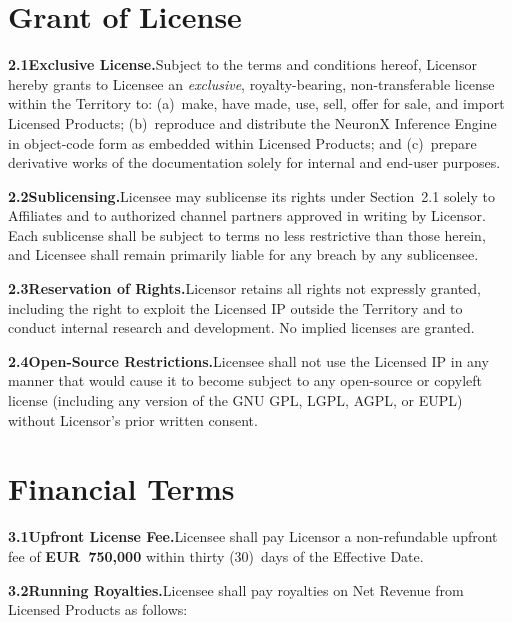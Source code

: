 \documentclass[11pt,a4paper]{article}
\begin{document}
\section{Grant of License}

\textbf{2.1\enspace Exclusive License.}\enspace Subject to the terms and conditions hereof,
Licensor hereby grants to Licensee an \textit{exclusive}, royalty-bearing, non-transferable
license within the Territory to: (a)~make, have made, use, sell, offer for sale, and import
Licensed Products; (b)~reproduce and distribute the NeuronX Inference Engine in object-code form
as embedded within Licensed Products; and (c)~prepare derivative works of the documentation
solely for internal and end-user purposes.

\textbf{2.2\enspace Sublicensing.}\enspace Licensee may sublicense its rights under Section~2.1
solely to Affiliates and to authorized channel partners approved in writing by Licensor.
Each sublicense shall be subject to terms no less restrictive than those herein, and Licensee
shall remain primarily liable for any breach by any sublicensee.

\textbf{2.3\enspace Reservation of Rights.}\enspace Licensor retains all rights not expressly
granted, including the right to exploit the Licensed IP outside the Territory and to conduct
internal research and development. No implied licenses are granted.

\textbf{2.4\enspace Open-Source Restrictions.}\enspace Licensee shall not use the Licensed IP
in any manner that would cause it to become subject to any open-source or copyleft license
(including any version of the GNU GPL, LGPL, AGPL, or EUPL) without Licensor's prior written
consent.

\section{Financial Terms}

\textbf{3.1\enspace Upfront License Fee.}\enspace Licensee shall pay Licensor a non-refundable
upfront fee of \textbf{EUR~750{,}000} within thirty (30)~days of the Effective Date.

\textbf{3.2\enspace Running Royalties.}\enspace Licensee shall pay royalties on Net Revenue
from Licensed Products as follows:
\end{document}
